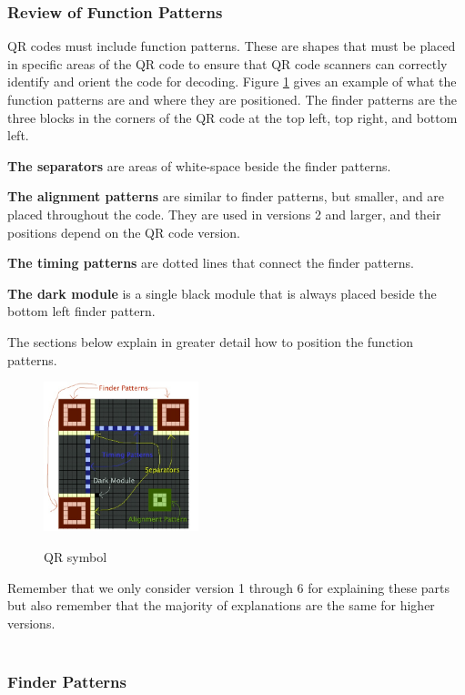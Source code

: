 \subsubsection{Review of Function Patterns}

QR codes must include function patterns. These are shapes that must be placed in specific areas of the QR code to ensure that QR code scanners can correctly identify and orient the code for decoding. Figure \ref{fig:22} gives an example of what the function patterns are and where they are positioned. The finder patterns are the three blocks in the corners of the QR code at the top left, top right, and bottom left.

\textbf{The separators} are areas of white-space beside the finder patterns.

\textbf{The alignment patterns} are similar to finder patterns, but smaller, and are placed throughout the code. They are used in versions 2 and larger, and their positions depend on the QR code version.

\textbf{The timing patterns} are dotted lines that connect the finder patterns.

\textbf{The dark module} is a single black module that is always placed beside the bottom left finder pattern.

The sections below explain in greater detail how to position the function patterns. 
\begin{figure}[H]
  \caption{QR symbol\cite{Thonky}}
  \centering
    \includegraphics[width=0.4\textwidth]{figures/QR.jpg}
    \label{fig:22}
\end{figure}

Remember that we only consider version 1 through 6 for explaining these parts but also remember that the majority of explanations are the same for higher versions.\\
\\
\subsubsection{Finder Patterns}

